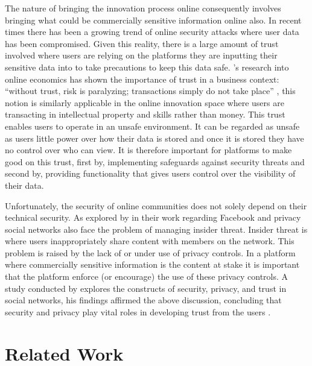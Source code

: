 The nature of bringing the innovation process online consequently involves bringing what could be commercially sensitive information online also. In recent times there has been a growing trend of online security attacks where user data has been compromised. Given this reality, there is a large amount of trust involved where users are relying on the platforms they are inputting their sensitive data into to take precautions to keep this data safe. \citeauthor{boyd2002community}'s research into online economics has shown the importance of trust in a business context: ``without trust, risk is paralyzing; transactions simply do not take place'' \cite{boyd2002community}, this notion is similarly applicable in the online innovation space where users are transacting in intellectual property and skills rather than money. This trust enables users to operate in an unsafe environment. It can be regarded as unsafe as users little power over how their data is stored and once it is stored they have no control over who can view. It is therefore important for platforms to make good on this trust, first by, implementing safeguards against security threats and second by, providing functionality that gives users control over the visibility of their data.

Unfortunately, the security of online communities does not solely depend on their technical security. As explored by \citeauthor{johnson2012facebook} in their work regarding Facebook and privacy \cite{johnson2012facebook} social networks also face the problem of managing insider threat. Insider threat is where users inappropriately share content with members on the network. This problem is raised by the lack of or under use of privacy controls. In a platform where commercially sensitive information is the content at stake it is important that the platform enforce (or encourage) the use of these privacy controls. A study conducted by \citeauthor{shin2010effects} explores the constructs of security, privacy, and trust in social networks, his findings affirmed the above discussion, concluding that security and privacy play vital roles in developing trust from the users \cite{shin2010effects}.

\section{Related Work}

